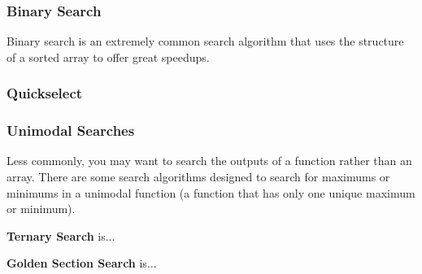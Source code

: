 \subsubsection{Binary Search}

Binary search is an extremely common search algorithm that uses the structure of a sorted array to offer great speedups.

\subsubsection{Quickselect}

\subsubsection{Unimodal Searches}

Less commonly, you may want to search the outputs of a function rather than an array. There are some search algorithms designed to search for maximums or minimums in a unimodal function (a function that has only one unique maximum or minimum).

\textbf{Ternary Search} is...

\textbf{Golden Section Search} is...